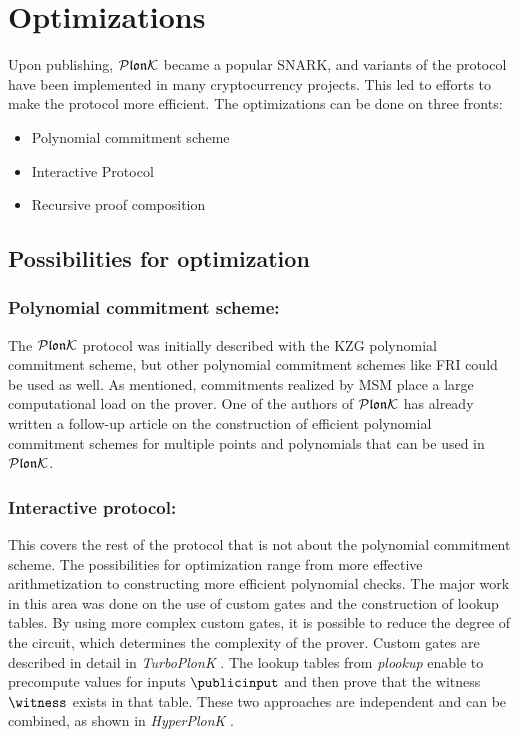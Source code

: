 \chapter{Optimizations}
\label{chap:5}

Upon publishing, $\mathcal{P}\mathfrak{lon}\mathcal{K}$ became a popular SNARK, and variants of the protocol have been implemented in many cryptocurrency projects. This led to efforts to make the protocol more efficient. The optimizations can be done on three fronts:
\begin{itemize}
    \item Polynomial commitment scheme 
    \item Interactive Protocol
    \item Recursive proof composition
\end{itemize}

\section{Possibilities for optimization}
\label{optimization-possibilities}

\subsection{Polynomial commitment scheme:} The $\mathcal{P}\mathfrak{lon}\mathcal{K}$ protocol was initially described with the KZG \cite{KZG} polynomial commitment scheme, but other polynomial commitment schemes like FRI \cite{fri} could be used as well. As mentioned, commitments realized by MSM place a large computational load on the prover. One of the authors of $\mathcal{P}\mathfrak{lon}\mathcal{K}$ has already written a follow-up article on the construction of efficient polynomial commitment schemes for multiple points and polynomials \cite{shplonk} that can be used in $\mathcal{P}\mathfrak{lon}\mathcal{K}$.

\subsection{Interactive protocol:} This covers the rest of the protocol that is not about the polynomial commitment scheme. The possibilities for optimization range from more effective arithmetization to constructing more efficient polynomial checks. The major work in this area was done on the use of custom gates and the construction of lookup tables. By using more complex custom gates, it is possible to reduce the degree of the circuit, which determines the complexity of the prover. Custom gates are described in detail in \textit{TurboPlonK} \cite{turboplonk}. The lookup tables from \textit{plookup} \cite{plookup} enable to precompute values for inputs $\publicinput$ and then prove that the witness $\witness$ exists in that table. These two approaches are independent and can be combined, as shown in \textit{HyperPlonK} \cite{HyperPlonk}.

